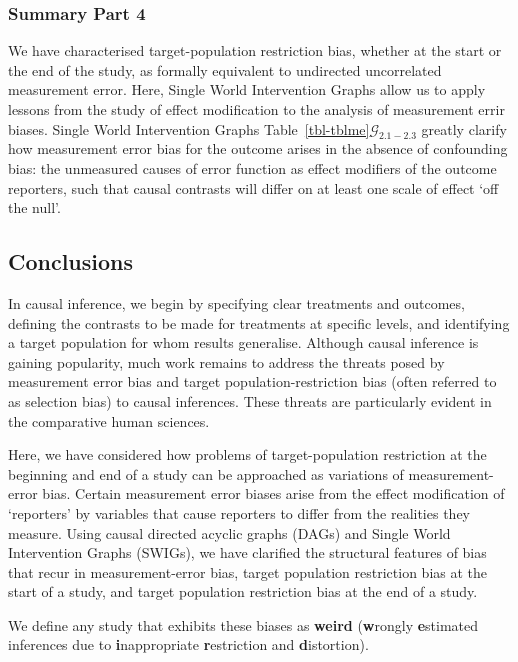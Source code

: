 \documentclass[
  single column]{article}
\begin{document}
\subsubsection{Summary Part 4}\label{summary-part-4}

We have characterised target-population restriction bias, whether at the
start or the end of the study, as formally equivalent to undirected
uncorrelated measurement error. Here, Single World Intervention Graphs
allow us to apply lessons from the study of effect modification to the
analysis of measurement errir biases. Single World Intervention Graphs
Table~\ref{tbl-tblme}\(\mathcal{G}_{2.1-2.3}\) greatly clarify how
measurement error bias for the outcome arises in the absence of
confounding bias: the unmeasured causes of error function as effect
modifiers of the outcome reporters, such that causal contrasts will
differ on at least one scale of effect `off the null'.

\subsection{Conclusions}\label{conclusions}

In causal inference, we begin by specifying clear treatments and
outcomes, defining the contrasts to be made for treatments at specific
levels, and identifying a target population for whom results generalise.
Although causal inference is gaining popularity, much work remains to
address the threats posed by measurement error bias and target
population-restriction bias (often referred to as selection bias) to
causal inferences. These threats are particularly evident in the
comparative human sciences.

Here, we have considered how problems of target-population restriction
at the beginning and end of a study can be approached as variations of
measurement-error bias. Certain measurement error biases arise from the
effect modification of `reporters' by variables that cause reporters to
differ from the realities they measure. Using causal directed acyclic
graphs (DAGs) and Single World Intervention Graphs (SWIGs), we have
clarified the structural features of bias that recur in
measurement-error bias, target population restriction bias at the start
of a study, and target population restriction bias at the end of a
study.

We define any study that exhibits these biases as \textbf{weird}
(\textbf{w}rongly \textbf{e}stimated inferences due to
\textbf{i}nappropriate \textbf{r}estriction and \textbf{d}istortion).
\end{document}
